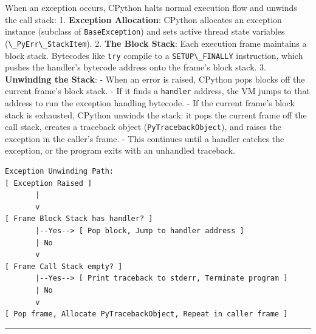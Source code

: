 When an exception occurs, CPython halts normal execution flow and
unwinds the call stack: 1. \textbf{Exception Allocation}: CPython
allocates an exception instance (subclass of
\passthrough{\lstinline!BaseException!}) and sets active thread state
variables (\passthrough{\lstinline!\_PyErr\_StackItem!}). 2. \textbf{The
Block Stack}: Each execution frame maintains a block stack. Bytecodes
like \passthrough{\lstinline!try!} compile to a
\passthrough{\lstinline!SETUP\_FINALLY!} instruction, which pushes the
handler's bytecode address onto the frame's block stack. 3.
\textbf{Unwinding the Stack}: - When an error is raised, CPython pops
blocks off the current frame's block stack. - If it finds a
\passthrough{\lstinline!handler!} address, the VM jumps to that address
to run the exception handling bytecode. - If the current frame's block
stack is exhausted, CPython unwinds the stack: it pops the current frame
off the call stack, creates a traceback object
(\passthrough{\lstinline!PyTracebackObject!}), and raises the exception
in the caller's frame. - This continues until a handler catches the
exception, or the program exits with an unhandled traceback.

\begin{lstlisting}
Exception Unwinding Path:
[ Exception Raised ]
       |
       v
[ Frame Block Stack has handler? ]
       |--Yes--> [ Pop block, Jump to handler address ]
       | No
       v
[ Frame Call Stack empty? ]
       |--Yes--> [ Print traceback to stderr, Terminate program ]
       | No
       v
[ Pop frame, Allocate PyTracebackObject, Repeat in caller frame ]
\end{lstlisting}

\begin{center}\rule{0.5\linewidth}{0.5pt}\end{center}
